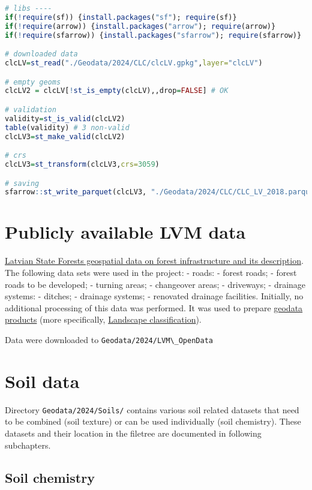 \documentclass[
]{book}
\newcommand{\passthrough}[1]{#1}
\begin{document}
\begin{lstlisting}[language=R]
# libs ----
if(!require(sf)) {install.packages("sf"); require(sf)}
if(!require(arrow)) {install.packages("arrow"); require(arrow)}
if(!require(sfarrow)) {install.packages("sfarrow"); require(sfarrow)}

# downloaded data
clcLV=st_read("./Geodata/2024/CLC/clcLV.gpkg",layer="clcLV")

# empty geoms
clcLV2 = clcLV[!st_is_empty(clcLV),,drop=FALSE] # OK

# validation
validity=st_is_valid(clcLV2) 
table(validity) # 3 non-valid
clcLV3=st_make_valid(clcLV2)

# crs
clcLV3=st_transform(clcLV3,crs=3059)

# saving
sfarrow::st_write_parquet(clcLV3, "./Geodata/2024/CLC/CLC_LV_2018.parquet")
\end{lstlisting}

\section{Publicly available LVM data}\label{Ch04.06}

\href{https://data.gov.lv/dati/lv/dataset/as-latvijas-valsts-mezi-mezsaimniecibas-infrastruktura}{Latvian State Forests geospatial data on forest infrastructure and its description}. The
following data sets were used in the project:
- roads:
- forest roads;
- forest roads to be developed;
- turning areas;
- changeover areas;
- driveways;
- drainage systems:
- ditches;
- drainage systems;
- renovated drainage facilities.
Initially, no additional processing of this data was performed. It was used to
prepare \hyperref[Ch05]{geodata products} (more specifically, \hyperref[Ch05.03]{Landscape classification}).

Data were downloaded to \passthrough{\lstinline!Geodata/2024/LVM\_OpenData!}

\section{Soil data}\label{Ch04.07}

Directory \passthrough{\lstinline!Geodata/2024/Soils/!} contains various soil related datasets that need
to be combined (soil texture) or can be used individually (soil chemistry). These
datasets and their location in the filetree are documented in following subchapters.

\subsection{Soil chemistry}\label{Ch04.07.01}
\end{document}

